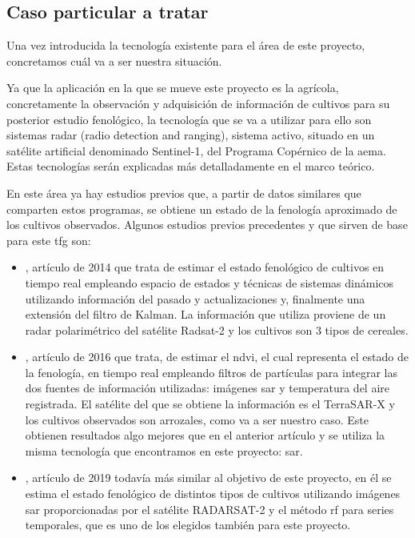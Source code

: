 \subsection{Caso particular a tratar}
\par Una vez introducida la tecnología existente para el área de este proyecto, concretamos cuál va a ser nuestra situación.
\\
\par Ya que la aplicación en la que se mueve este proyecto es la agrícola, concretamente la observación y adquisición de información de cultivos para su posterior estudio fenológico, la tecnología que se va a utilizar para ello son sistemas radar (radio detection and ranging), sistema activo, situado en un satélite artificial denominado Sentinel-1, del Programa Copérnico de la \gls{aema}. Estas tecnologías serán explicadas más detalladamente en el marco teórico.
\\
\par En este área ya hay estudios previos que, a partir de datos similares que comparten estos programas, se obtiene un estado de la fenología aproximado de los cultivos observados. Algunos estudios previos precedentes y que sirven de base para este \gls{tfg} son:
\\
\begin{itemize}
    \item \cite{Juanma2014}, artículo de 2014 que trata de estimar el estado fenológico de cultivos en tiempo real empleando espacio de estados y técnicas de sistemas dinámicos utilizando información del pasado y actualizaciones y, finalmente una extensión del filtro de Kalman. La información que utiliza proviene de un radar polarimétrico del satélite Radsat-2 y los cultivos son 3 tipos de cereales. 
    \\
    \item \cite{Juanma2016}, artículo de 2016 que trata, de estimar el \gls{ndvi}, el cual representa el estado de la fenología, en tiempo real empleando filtros de partículas para integrar las dos fuentes de información utilizadas: imágenes \gls{sar} y temperatura del aire registrada. El satélite del que se obtiene la información es el TerraSAR-X y los cultivos observados son arrozales, como va a ser nuestro caso. Este obtienen resultados algo mejores que en el anterior artículo y se utiliza la misma tecnología que encontramos en este proyecto: \gls{sar}. 
    \\
    \item \cite{artRF}, artículo de 2019 todavía más similar al objetivo de este proyecto, en él se estima el estado fenológico de distintos tipos de cultivos utilizando imágenes \gls{sar} proporcionadas por el satélite RADARSAT-2 y el método \gls{rf} para series temporales, que es uno de los elegidos también para este proyecto. 
\end{itemize} 

